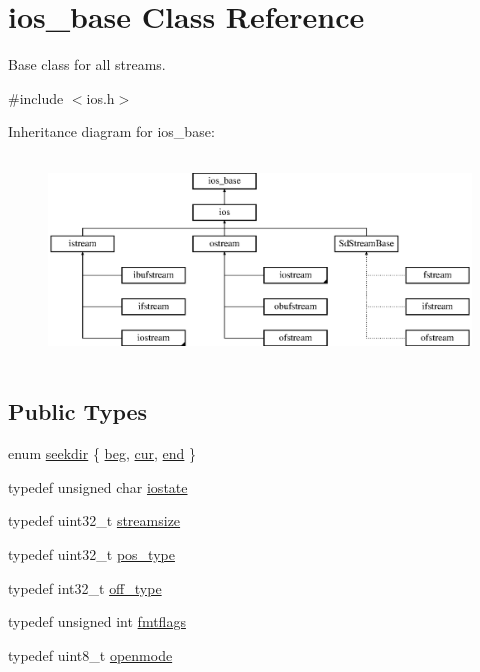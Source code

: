 \hypertarget{classios__base}{}\section{ios\+\_\+base Class Reference}
\label{classios__base}


Base class for all streams.  




{\ttfamily \#include $<$ios.\+h$>$}

Inheritance diagram for ios\+\_\+base\+:\begin{figure}[H]
\begin{center}
\leavevmode
\includegraphics[height=5.490196cm]{classios__base}
\end{center}
\end{figure}
\subsection*{Public Types}
\begin{DoxyCompactItemize}
\item 
enum \hyperlink{classios__base_ab01103ba35f6ba93a704b3ec0c86191e}{seekdir} \{ \hyperlink{classios__base_ab01103ba35f6ba93a704b3ec0c86191ea6639b4dd9e9b57ffef4a176cd1a1e7bb}{beg}, 
\hyperlink{classios__base_ab01103ba35f6ba93a704b3ec0c86191ea53910041525b9e2f33bfc3bb4482134c}{cur}, 
\hyperlink{classios__base_ab01103ba35f6ba93a704b3ec0c86191eaae47c0ae984e90b38907783a1a804811}{end}
 \}
\item 
typedef unsigned char \hyperlink{classios__base_aef19291eeae0f072ac42c6ba1fe3033c}{iostate}
\item 
typedef uint32\+\_\+t \hyperlink{classios__base_a82836e1d3cc603fba8f0b54d323a2dff}{streamsize}
\item 
typedef uint32\+\_\+t \hyperlink{classios__base_abe85cf1f181b8bce8022f05ab76aae7f}{pos\+\_\+type}
\item 
typedef int32\+\_\+t \hyperlink{classios__base_a45de7cca0d01da781f4b886179c65c22}{off\+\_\+type}
\item 
typedef unsigned int \hyperlink{classios__base_ac9a54e52cef4f01ac0afd8ae896a3413}{fmtflags}
\item 
typedef uint8\+\_\+t \hyperlink{classios__base_aaa192ec0dccc43050715553a34644523}{openmode}
\end{DoxyCompactItemize}

